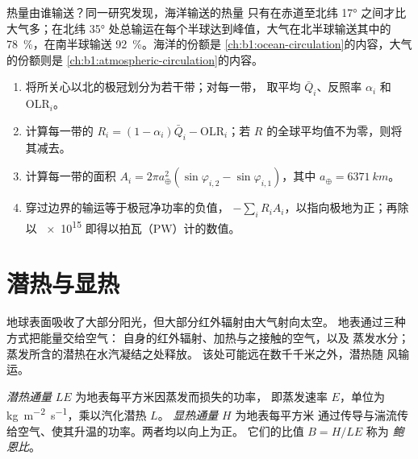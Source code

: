 热量由谁输送？同一研究发现，海洋输送的热量
只有在赤道至北纬 \ang{17} 之间才比大气多；在北纬 \ang{35}
处总输运在每个半球达到峰值，大气在北半球输送其中的
\qty{78}{\percent}，在南半球输送 \qty{92}{\percent}。海洋的份额是
\cref{ch:b1:ocean-circulation}的内容，大气的份额则是
\cref{ch:b1:atmospheric-circulation}的内容。

\begin{method}[由纬向带计算输运]\label{met:b1:radiation-heat-transport:bands}
\begin{enumerate}
  \item 将所关心以北的极冠划分为若干带；对每一带，
        取平均 $\bar Q_i$、反照率 $\alpha_i$ 和 OLR$_i$。
  \item 计算每一带的 $R_i = (1 - \alpha_i)\bar Q_i -
        \text{OLR}_i$；若 $R$ 的全球平均值不为零，则将其减去。
  \item 计算每一带的面积 $A_i = 2\pi a_\oplus^2(\sin\varphi_{i,2} -
        \sin\varphi_{i,1})$，其中 $a_\oplus = \qty{6371}{km}$。
  \item 穿过边界的输运等于极冠净功率的负值，
        $-\sum_i R_i A_i$，以指向极地为正；再除以 \num{e15}
        即得以拍瓦（PW）计的数值。
\end{enumerate}
\end{method}

\section{潜热与显热}\label{sec:b1:radiation-heat-transport:latent}

地球表面吸收了大部分阳光，但大部分红外辐射由大气射向太空。
地表通过三种方式把能量交给空气：
自身的红外辐射、加热与之接触的空气，以及
蒸发水分；蒸发所含的潜热在水汽凝结之处释放。
该处可能远在数千千米之外，潜热随
风输运。

\begin{definition}\label{def:b1:radiation-heat-transport:surface-fluxes}
\emph{潜热通量} $LE$ 为地表每平方米因蒸发而损失的功率，
即蒸发速率 $E$，单位为
\unit{kg.m^{-2}.s^{-1}}，乘以汽化潜热 $L$。
\emph{显热通量} $H$ 为地表每平方米
通过传导与湍流传给空气、使其升温的功率。两者均以向上为正。
它们的比值 $B = H/LE$ 称为
\emph{鲍恩比}。
\end{definition}

